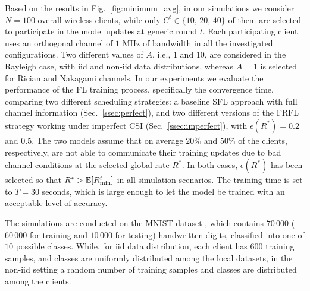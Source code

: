 \documentclass[10pt, conference, letterpaper]{IEEEtran}
\begin{document}
	Based on the results in Fig.~\ref{fig:minimum_avg}, in our simulations we consider $N=100$ overall wireless clients, while only $C^t \in \{10,\,20,\,40\}$ of them are selected to participate in the model updates at generic round $t$. 
	Each participating client uses an orthogonal channel of $1$ MHz of bandwidth in all the investigated configurations. Two different values of $A$, i.e., $1$ and $10$, are considered in the Rayleigh case, with iid and non-iid data distributions, whereas $A=1$ is selected for Rician and Nakagami channels. In our experiments we evaluate the performance of the FL training process, specifically the convergence time, comparing two different scheduling strategies: 
	a baseline SFL approach with full channel information (Sec.~\ref{ssec:perfect}), and two different versions of the FRFL strategy working under imperfect CSI (Sec.~\ref{ssec:imperfect}), with $\epsilon(R^*)=0.2$ and $0.5$. The two models assume that on average $20\%$ and $50\%$ of the clients, respectively, are not able to communicate their training updates due to bad channel conditions at the selected global rate $R^*$. In both cases, $\epsilon(R^*)$ has been selected so that $R^*>\mathbb{E}[R_{\rm min}^t]$ in all simulation scenarios. 
	The training time is set to $T = 30$ seconds,  which is large enough to let the model be trained with an acceptable level of accuracy.
	
	
	
	The simulations are conducted on the MNIST dataset \cite{lecun-mnist}, which contains $70\,000$ ($60\,000$ for training and $10\,000$ for testing)  handwritten digits, classified into one of $10$ possible classes. 
	While, for \gls{iid} data distribution, each client has $600$ training samples, and classes are uniformly distributed among the local datasets, in the non-iid setting a random number of training samples and classes are distributed among the clients.
	
\end{document}
